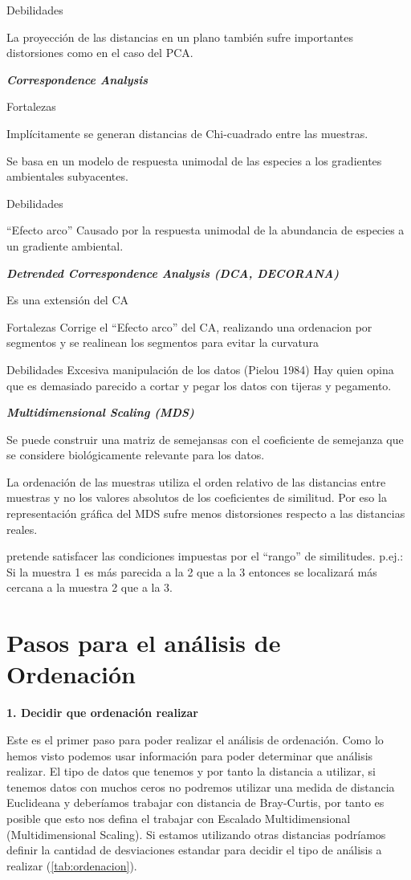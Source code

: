 \documentclass[]{book}
\begin{document}
Debilidades

La proyección de las distancias en un plano también sufre importantes
distorsiones como en el caso del PCA.

\textbf{\emph{Correspondence Analysis}}

Fortalezas

Implícitamente se generan distancias de Chi-cuadrado entre las muestras.

Se basa en un modelo de respuesta unimodal de las especies a los
gradientes ambientales subyacentes.

Debilidades

``Efecto arco'' Causado por la respuesta unimodal de la abundancia de
especies a un gradiente ambiental.

\textbf{\emph{Detrended Correspondence Analysis (DCA, DECORANA)}}

Es una extensión del CA

Fortalezas Corrige el ``Efecto arco'' del CA, realizando una ordenacion
por segmentos y se realinean los segmentos para evitar la curvatura

Debilidades Excesiva manipulación de los datos (Pielou 1984) Hay quien
opina que es demasiado parecido a cortar y pegar los datos con tijeras y
pegamento.

\textbf{\emph{Multidimensional Scaling (MDS)}}

Se puede construir una matriz de semejansas con el coeficiente de
semejanza que se considere biológicamente relevante para los datos.

La ordenación de las muestras utiliza el orden relativo de las
distancias entre muestras y no los valores absolutos de los coeficientes
de similitud. Por eso la representación gráfica del MDS sufre menos
distorsiones respecto a las distancias reales.

pretende satisfacer las condiciones impuestas por el ``rango'' de
similitudes. p.ej.: Si la muestra 1 es más parecida a la 2 que a la 3
entonces se localizará más cercana a la muestra 2 que a la 3.

\section{Pasos para el análisis de
Ordenación}\label{pasos-para-el-analisis-de-ordenacion}

\textbf{1. Decidir que ordenación realizar}

Este es el primer paso para poder realizar el análisis de ordenación.
Como lo hemos visto podemos usar información para poder determinar que
análisis realizar. El tipo de datos que tenemos y por tanto la distancia
a utilizar, si tenemos datos con muchos ceros no podremos utilizar una
medida de distancia Euclideana y deberíamos trabajar con distancia de
Bray-Curtis, por tanto es posible que esto nos defina el trabajar con
Escalado Multidimensional (Multidimensional Scaling). Si estamos
utilizando otras distancias podríamos definir la cantidad de
desviaciones estandar para decidir el tipo de análisis a realizar
(\ref{tab:ordenacion}).
\end{document}
